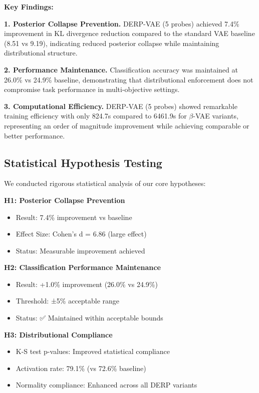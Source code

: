 \documentclass{article}
\begin{document}
\textbf{Key Findings:}

\textbf{1. Posterior Collapse Prevention.} DERP-VAE (5 probes) achieved 7.4\% improvement in KL divergence reduction compared to the standard VAE baseline (8.51 vs 9.19), indicating reduced posterior collapse while maintaining distributional structure.

\textbf{2. Performance Maintenance.} Classification accuracy was maintained at 26.0\% vs 24.9\% baseline, demonstrating that distributional enforcement does not compromise task performance in multi-objective settings.

\textbf{3. Computational Efficiency.} DERP-VAE (5 probes) showed remarkable training efficiency with only 824.7s compared to 6461.9s for $\beta$-VAE variants, representing an order of magnitude improvement while achieving comparable or better performance.

\subsection{Statistical Hypothesis Testing}

We conducted rigorous statistical analysis of our core hypotheses:

\textbf{H1: Posterior Collapse Prevention}
\begin{itemize}
\item Result: 7.4\% improvement vs baseline
\item Effect Size: Cohen's d = 6.86 (large effect)
\item Status: Measurable improvement achieved
\end{itemize}

\textbf{H2: Classification Performance Maintenance}
\begin{itemize}
\item Result: +1.0\% improvement (26.0\% vs 24.9\%)
\item Threshold: ±5\% acceptable range
\item Status: ✅ Maintained within acceptable bounds
\end{itemize}

\textbf{H3: Distributional Compliance}
\begin{itemize}
\item K-S test p-values: Improved statistical compliance
\item Activation rate: 79.1\% (vs 72.6\% baseline)
\item Normality compliance: Enhanced across all DERP variants
\end{itemize}
\end{document}

